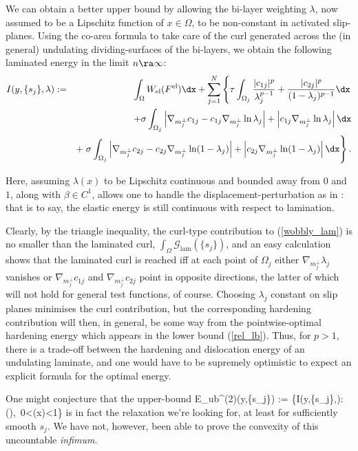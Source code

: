 \documentclass[11pt,reqno]{amsart}
\theoremstyle{plain}
\theoremstyle{definition}
\theoremstyle{remark}
\begin{document}
We can obtain a better upper bound by allowing the bi-layer weighting $\lambda$, now assumed to be a Lipschitz function of $x\in\Omega$, to be non-constant in activated slip-planes. Using the co-area formula to take care of the curl generated across the (in general) undulating dividing-surfaces of the bi-layers, we obtain the following laminated energy in the limit $n\ra\infty$:
\begin{eqnarray}\label{wobbly_lam}
I(y,\{s_j\},\lambda) & := & \int_{\Omega} W_{\textrm{el}}(F^{\mathrm{el}})\dx + \sum_{j=1}^N\left\{\tau\int_{\Omega_j}\frac{|c_{1j}|^p}{\lambda_j^{p-1}} + \frac{|c_{2j}|^p}{(1-\lambda_j)^{p-1}}\dx\right.\nonumber\\
 & & + \sigma\int_{\Omega_j}\left|\nabla_{m_j^{\perp}} c_{1j} - c_{1j}\nabla_{m_j^{\perp}}\ln\lambda_j\right| +  \left|c_{1j}\nabla_{m_j^{\perp}}\ln\lambda_j\right|\dx\nonumber\\
 & & + \left.\sigma\int_{\Omega_j}\left|\nabla_{m_j^{\perp}} c_{2j} - c_{2j}\nabla_{m_j^{\perp}}\ln(1-\lambda_j)\right| +  \left|c_{2j}\nabla_{m_j^{\perp}}\ln(1-\lambda_j)\right|\dx\right\}.
\end{eqnarray}

Here, assuming $\lambda(x)$ to be Lipschitz continuous and bounded away from $0$ and $1$, along with $\beta\in C^1$, allows one to handle the displacement-perturbation as in \cite{ang}: that is to say, the elastic energy is still continuous with respect to lamination.

Clearly, by the triangle inequality, the curl-type contribution to (\ref{wobbly_lam})
is no smaller than the laminated curl, $\int_{\Omega}\mathcal{G}_{\mathrm{lam}}(\{s_j\})$, and an easy calculation shows that the laminated curl is reached iff at each point of $\Omega_j$ either $\nabla_{m_j^{\perp}}\lambda_j$ vanishes or $\nabla_{m_j^{\perp}} c_{1j}$ and $\nabla_{m_j^{\perp}} c_{2j}$ point in opposite directions, the latter of which will not hold for general test functions, of course. Choosing $\lambda_j$ constant on slip planes minimises the curl contribution, but the corresponding hardening contribution will then, in general, be some way from the pointwise-optimal hardening energy which appears in the lower bound (\ref{rel_lb}). Thus, for $p>1$, there is a trade-off between the hardening and dislocation energy of an undulating laminate, and one would have to be supremely optimistic to expect an explicit formula for the optimal energy.

One might conjecture that the upper-bound
\be
E_{\textrm{ub}}^{(2)}(y,\{s_j\}) := \inf\left\{I(y,\{s_j\},\lambda):\lambda\in{}(\Omega),~0<\lambda(x)<1\right\}
\ee
is in fact the relaxation we're looking for, at least for sufficiently smooth $s_j$. We have not, however, been able to prove the convexity of this uncountable {\em infimum}.
\end{document}
